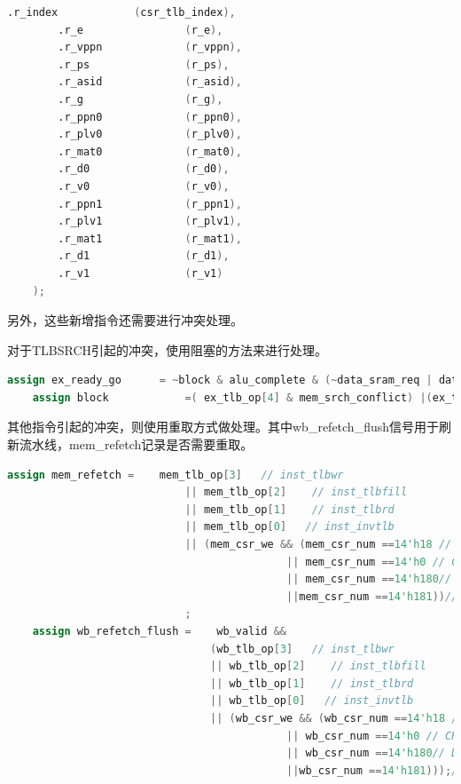 \documentclass[11pt]{article}
\begin{document}
\begin{enumerate}
\begin{lstlisting}[language=verilog]
        .r_index            (csr_tlb_index),
        .r_e                (r_e),
        .r_vppn             (r_vppn),
        .r_ps               (r_ps),
        .r_asid             (r_asid),
        .r_g                (r_g),
        .r_ppn0             (r_ppn0),
        .r_plv0             (r_plv0),
        .r_mat0             (r_mat0),
        .r_d0               (r_d0),
        .r_v0               (r_v0),
        .r_ppn1             (r_ppn1),
        .r_plv1             (r_plv1),
        .r_mat1             (r_mat1),
        .r_d1               (r_d1),
        .r_v1               (r_v1)
    );
  \end{lstlisting}
  另外，这些新增指令还需要进行冲突处理。\par
  对于TLBSRCH引起的冲突，使用阻塞的方法来进行处理。
  \begin{lstlisting}[language=verilog]
    assign ex_ready_go      = ~block & alu_complete & (~data_sram_req | data_sram_req & data_sram_addr_ok);//等待alu完成运算
    assign block            =( ex_tlb_op[4] & mem_srch_conflict) |(ex_tlb_op[4] & wb_srch_conflict);
  \end{lstlisting}
  其他指令引起的冲突，则使用重取方式做处理。其中wb\_refetch\_flush信号用于刷新流水线，mem\_refetch记录是否需要重取。
  \begin{lstlisting}[language=verilog]
    assign mem_refetch =    mem_tlb_op[3]   // inst_tlbwr
                            || mem_tlb_op[2]    // inst_tlbfill
                            || mem_tlb_op[1]    // inst_tlbrd
                            || mem_tlb_op[0]   // inst_invtlb
                            || (mem_csr_we && (mem_csr_num ==14'h18 // ASID
                                            || mem_csr_num ==14'h0 // CRMD
                                            || mem_csr_num ==14'h180// DMW0
                                            ||mem_csr_num ==14'h181))// DMW1
                            ;
    assign wb_refetch_flush =    wb_valid && 
                                (wb_tlb_op[3]   // inst_tlbwr
                                || wb_tlb_op[2]    // inst_tlbfill
                                || wb_tlb_op[1]    // inst_tlbrd
                                || wb_tlb_op[0]   // inst_invtlb
                                || (wb_csr_we && (wb_csr_num ==14'h18 // ASID
                                            || wb_csr_num ==14'h0 // CRMD
                                            || wb_csr_num ==14'h180// DMW0
                                            ||wb_csr_num ==14'h181)));// DMW1
  \end{lstlisting}

\end{enumerate}
\end{document}
